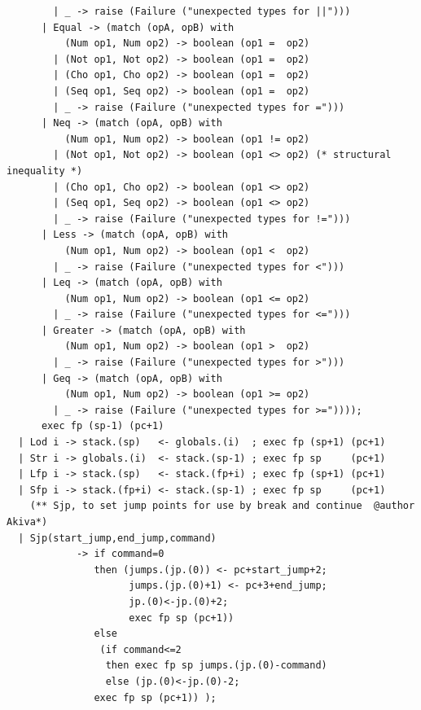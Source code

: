 \documentclass[12pt,A4]{book}
\begin{document}
\begin{verbatim}
        | _ -> raise (Failure ("unexpected types for ||")))
      | Equal -> (match (opA, opB) with 
          (Num op1, Num op2) -> boolean (op1 =  op2)
		| (Not op1, Not op2) -> boolean (op1 =  op2)
		| (Cho op1, Cho op2) -> boolean (op1 =  op2)
		| (Seq op1, Seq op2) -> boolean (op1 =  op2)
        | _ -> raise (Failure ("unexpected types for =")))
      | Neq -> (match (opA, opB) with
          (Num op1, Num op2) -> boolean (op1 != op2)
		| (Not op1, Not op2) -> boolean (op1 <> op2) (* structural inequality *)
		| (Cho op1, Cho op2) -> boolean (op1 <> op2)
		| (Seq op1, Seq op2) -> boolean (op1 <> op2)
        | _ -> raise (Failure ("unexpected types for !=")))
      | Less -> (match (opA, opB) with 
          (Num op1, Num op2) -> boolean (op1 <  op2)
        | _ -> raise (Failure ("unexpected types for <")))
      | Leq -> (match (opA, opB) with 
          (Num op1, Num op2) -> boolean (op1 <= op2)
        | _ -> raise (Failure ("unexpected types for <=")))
      | Greater -> (match (opA, opB) with 
          (Num op1, Num op2) -> boolean (op1 >  op2)
        | _ -> raise (Failure ("unexpected types for >")))
      | Geq -> (match (opA, opB) with 
          (Num op1, Num op2) -> boolean (op1 >= op2)
        | _ -> raise (Failure ("unexpected types for >="))));
      exec fp (sp-1) (pc+1)
  | Lod i -> stack.(sp)   <- globals.(i)  ; exec fp (sp+1) (pc+1)
  | Str i -> globals.(i)  <- stack.(sp-1) ; exec fp sp     (pc+1)
  | Lfp i -> stack.(sp)   <- stack.(fp+i) ; exec fp (sp+1) (pc+1)
  | Sfp i -> stack.(fp+i) <- stack.(sp-1) ; exec fp sp     (pc+1)
    (** Sjp, to set jump points for use by break and continue  @author Akiva*)
  | Sjp(start_jump,end_jump,command)
            -> if command=0 
               then (jumps.(jp.(0)) <- pc+start_jump+2; 
                     jumps.(jp.(0)+1) <- pc+3+end_jump;
                     jp.(0)<-jp.(0)+2;
                     exec fp sp (pc+1))
               else 
                (if command<=2  
                 then exec fp sp jumps.(jp.(0)-command)
                 else (jp.(0)<-jp.(0)-2; 
               exec fp sp (pc+1)) ); 


\end{verbatim}
\end{document}
